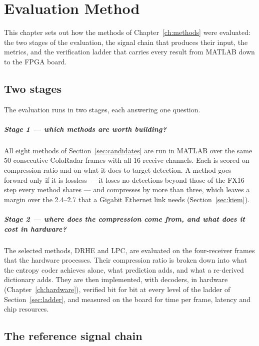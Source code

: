 \chapter{Evaluation Method}
\label{ch:evaluation}

This chapter sets out how the methods of Chapter~\ref{ch:methods} were
evaluated: the two stages of the evaluation, the signal chain that produces
their input, the metrics, and the verification ladder that carries every
result from MATLAB down to the FPGA board.

\section{Two stages}
\label{sec:stages}

The evaluation runs in two stages, each answering one question.

\paragraph{Stage 1 --- which methods are worth building?}
All eight methods of Section~\ref{sec:candidates} are run in MATLAB over the
same 50 consecutive ColoRadar frames with all 16 receive channels. Each is
scored on compression ratio and on what it does to target detection. A method
goes forward only if it is lossless --- it loses no detections beyond those of
the FX16 step every method shares --- and compresses by more than three, which
leaves a margin over the \num{2.4}--\num{2.7} that a Gigabit Ethernet link needs
(Section~\ref{sec:kiem}).

\paragraph{Stage 2 --- where does the compression come from, and what does it
cost in hardware?}
The selected methods, DRHE and LPC, are evaluated on the four-receiver frames
that the hardware processes. Their compression ratio is broken down into what
the entropy coder achieves alone, what prediction adds, and what a re-derived
dictionary adds. They are then implemented, with decoders, in hardware
(Chapter~\ref{ch:hardware}), verified bit for bit at every level of the ladder
of Section~\ref{sec:ladder}, and measured on the board for time per frame,
latency and chip resources.

\section{The reference signal chain}
\label{sec:refchain}

